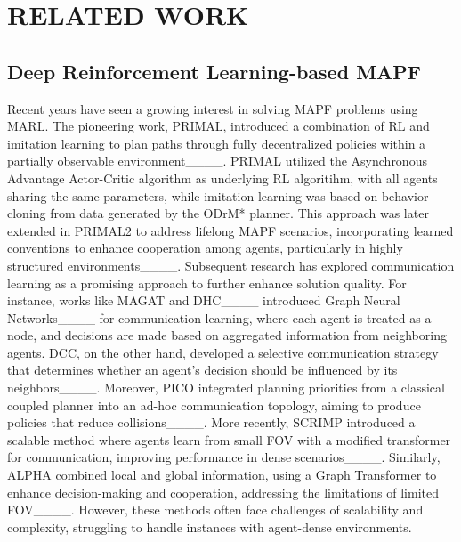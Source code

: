 \section{RELATED WORK}
\subsection{Deep Reinforcement Learning-based MAPF}

Recent years have seen a growing interest in solving MAPF problems using MARL. The pioneering work, PRIMAL, introduced a combination of RL and imitation learning to plan paths through fully decentralized policies within a partially observable environment____. PRIMAL utilized the Asynchronous Advantage Actor-Critic algorithm as underlying RL algoritihm, with all agents sharing the same parameters, while imitation learning was based on behavior cloning from data generated by the ODrM* planner. This approach was later extended in PRIMAL2 to address lifelong MAPF scenarios, incorporating learned conventions to enhance cooperation among agents, particularly in highly structured environments____. Subsequent research has explored communication learning as a promising approach to further enhance solution quality. For instance, works like MAGAT and DHC____ introduced Graph Neural Networks____ for communication learning, where each agent is treated as a node, and decisions are made based on aggregated information from neighboring agents. DCC, on the other hand, developed a selective communication strategy that determines whether an agent's decision should be influenced by its neighbors____. Moreover, PICO integrated planning priorities from a classical coupled planner into an ad-hoc communication topology, aiming to produce policies that reduce collisions____. More recently, SCRIMP introduced a scalable method where agents learn from small FOV with a modified transformer for communication, improving performance in dense scenarios____. Similarly, ALPHA combined local and global information, using a Graph Transformer to enhance decision-making and cooperation, addressing the limitations of limited FOV____. However, these methods often face challenges of scalability and complexity, struggling to handle instances with agent-dense environments.

